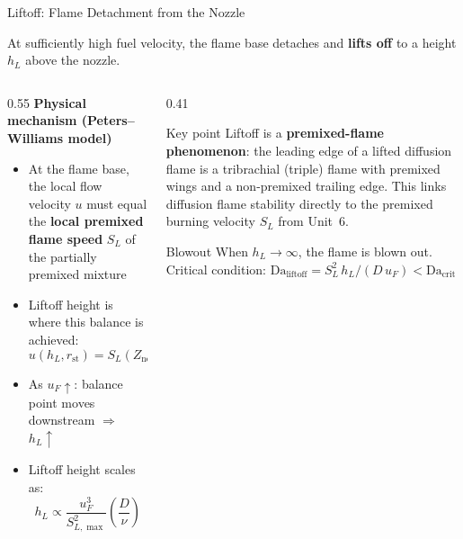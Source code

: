 \documentclass[12pt,aspectratio=169]{beamer}
\newcommand{\Da}{\mathrm{Da}}
\newcommand{\SL}{S_L}
\begin{document}
\begin{frame}{Liftoff: Flame Detachment from the Nozzle}

  At sufficiently high fuel velocity, the flame base detaches and
  \textbf{lifts off} to a height $h_L$ above the nozzle.

  \begin{columns}[t]
    \begin{column}{0.55\textwidth}
      \textbf{Physical mechanism (Peters--Williams model)}
      \begin{itemize}
        \item At the flame base, the local flow velocity $u$
              must equal the \textbf{local premixed flame speed}
              $\SL$ of the partially premixed mixture
        \item Liftoff height is where this balance is achieved:
              \[
                u(h_L,r_{\text{st}}) = \SL(Z_{\text{near st}})
              \]
        \item As $u_F \uparrow$: balance point moves downstream
              $\Rightarrow$ $h_L \uparrow$
        \item Liftoff height scales as:
              \[
                h_L \propto \frac{u_F^3}{S_{L,\max}^2}
                \left(\frac{D}{\nu}\right)
              \]
      \end{itemize}
    \end{column}
    \begin{column}{0.41\textwidth}
      \begin{exampleblock}{Key point}
        Liftoff is a \textbf{premixed-flame phenomenon}:
        the leading edge of a lifted diffusion flame is a
        tribrachial (triple) flame with premixed wings
        and a non-premixed trailing edge.
        This links diffusion flame stability directly to the
        premixed burning velocity $\SL$ from Unit~6.
      \end{exampleblock}
      \vspace{4pt}
      \begin{alertblock}{Blowout}
        When $h_L \to \infty$, the flame is blown out.
        Critical condition:
        $\Da_{\text{liftoff}} = \SL^2\,h_L/(D\,u_F) < \Da_{\text{crit}}$
      \end{alertblock}
    \end{column}
  \end{columns}
\end{frame}

\end{document}
